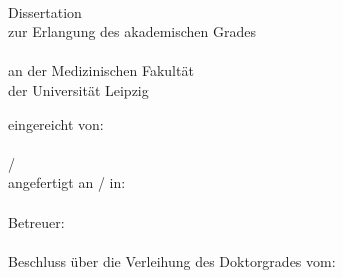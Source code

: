 \clearpage
\thispagestyle{empty}

\begin{titlepage}
\begin{center}

\null
\vspace{3\baselineskip}
\large{\tTitle} \\
\vspace{3\baselineskip}
Dissertation \\
zur Erlangung des akademischen Grades \\
\tDegree \\
\vspace{\baselineskip}
an der Medizinischen Fakultät \\
der Universität Leipzig \\
\vspace{6\baselineskip}
\end{center}

\vfill

\noindent
eingereicht von: \\
\tAuthor \\
\tBirthday / \tNativeTown \\

\noindent
angefertigt an / in: \\
\tDepartment \\

\noindent
Betreuer: \\
\tSupervisor \\

\noindent
Beschluss über die Verleihung des Doktorgrades vom: \\
\tDefenceDate

\end{titlepage}
